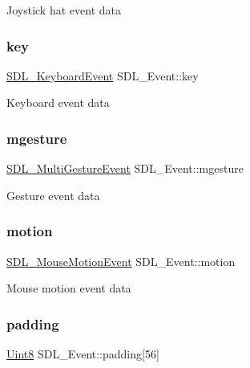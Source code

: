 Joystick hat event data \mbox{\label{union_s_d_l___event_ab99927835cc77a9b6bb50b419b4a27df}} 
\subsubsection{\texorpdfstring{key}{key}}
{\footnotesize\ttfamily \hyperlink{struct_s_d_l___keyboard_event}{S\+D\+L\+\_\+\+Keyboard\+Event} S\+D\+L\+\_\+\+Event\+::key}

Keyboard event data \mbox{\label{union_s_d_l___event_ac19b3c6a6b5181a51eb4fbe2cbe726a9}} 
\subsubsection{\texorpdfstring{mgesture}{mgesture}}
{\footnotesize\ttfamily \hyperlink{struct_s_d_l___multi_gesture_event}{S\+D\+L\+\_\+\+Multi\+Gesture\+Event} S\+D\+L\+\_\+\+Event\+::mgesture}

Gesture event data \mbox{\label{union_s_d_l___event_ac3c89e190faacbe84280cd539453bab6}} 
\subsubsection{\texorpdfstring{motion}{motion}}
{\footnotesize\ttfamily \hyperlink{struct_s_d_l___mouse_motion_event}{S\+D\+L\+\_\+\+Mouse\+Motion\+Event} S\+D\+L\+\_\+\+Event\+::motion}

Mouse motion event data \mbox{\label{union_s_d_l___event_aabb599570edfa54aad6255c1f24f2ad2}} 
\subsubsection{\texorpdfstring{padding}{padding}}
{\footnotesize\ttfamily \hyperlink{_s_d_l__stdinc_8h_a2944638813a090aa23e62f4da842c3e2}{Uint8} S\+D\+L\+\_\+\+Event\+::padding\mbox{[}56\mbox{]}}

